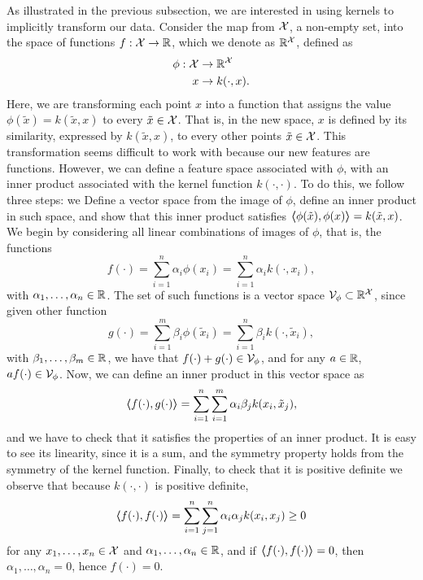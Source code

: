 As illustrated in the previous subsection, we are interested in using kernels to implicitly transform our data. Consider the map from $\mathcal{X}$, a non-empty set, into the space of functions $f: \mathcal{X} \to \mathbb{R}$, which we denote as $\mathbb{R}^{\mathcal{X}}$, defined as 
    \begin{equation}
        \begin{aligned}
            \nonumber
            \phi: \mathcal{X} &\to \mathbb{R}^{\mathcal{X}} \\
            x &\to k(\cdot, x) .
        \end{aligned}
    \end{equation}
Here, we are transforming each point $x$ into a function that assigns the value $\phi(\tilde{x}) = k(\tilde{x}, x)$ to every $\tilde{x} \in \mathcal{X}$. That is, in the new space, $x$ is defined by its similarity, expressed by $k(\tilde{x}, x)$, to every other points $\tilde{x} \in \mathcal{X}$. This transformation seems difficult to work with because our new features are functions.
However, we can define a feature space associated with $\phi$, with an inner product associated with the kernel function $k(\cdot, \cdot)$. To do this, we follow three steps: we Define a vector space from the image of $\phi$, define an inner product in such space, and show that this inner product satisfies $\bm{\left\langle} \phi(\tilde{x}), \phi(x) \bm{\right\rangle} = k(\tilde{x}, x)$.
We begin by considering all linear combinations of images of $\phi$, that is, the functions 
$$ f(\cdot) = \sum_{i=1}^n \alpha_i \phi(x_i) =\sum_{i=1}^n \alpha_i k(\cdot, x_i), $$
with $\alpha_1, \ldots, \alpha_n \in \mathbb{R}$.
The set of such functions is a vector space $\mathcal{V}_\phi \subset \mathbb{R}^{\mathcal{X}}$, since given other function 
$$ g(\cdot) = \sum_{i=1}^m \beta_i \phi(\tilde{x}_i) =\sum_{i=1}^n \beta_i k(\cdot, \tilde{x}_i) ,$$
with $\beta_1, \ldots, \beta_m \in \mathbb{R}$,
we have that $f(\cdot) + g(\cdot) \in \mathcal{V}_\phi$, and for any $a \in \mathbb{R}$,  $a f(\cdot) \in \mathcal{V}_\phi$.
Now, we can define an inner product in this vector space as 
$$ \bm{\left\langle} f(\cdot), g(\cdot) \bm{\right\rangle} = \sum_{i=1}^n \sum_{i=1}^m \alpha_i \beta_j k(x_i, \tilde{x}_j),$$
and we have to check that it satisfies the properties of an inner product. It is easy to see its linearity, since it is a sum, and the symmetry property holds from the symmetry of the kernel function. Finally, to check that it is positive definite we observe that because $k(\cdot, \cdot)$ is positive definite,
$$ \bm{\left\langle} f(\cdot), f(\cdot) \bm{\right\rangle} = \sum_{i=1}^n \sum_{j=1}^n \alpha_i \alpha_j k(x_i, x_j) \geq 0$$
for any $x_1, \ldots, x_n \in \mathcal{X}$ and $\alpha_1, \ldots, \alpha_n \in \mathbb{R}$, and if $\bm{\left\langle} f(\cdot), f(\cdot) \bm{\right\rangle} = 0$, then $\alpha_1, \ldots, \alpha_n =0$, hence $f(\cdot) = 0$.
